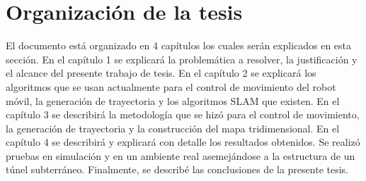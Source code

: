 


\section{Organizaci\'on de la tesis}

El documento está organizado en 4 capítulos los cuales serán explicados en esta
sección. En el capítulo 1 se explicará la problemática a resolver, la justificación y 
el alcance del presente trabajo de tesis. En el capítulo 2 se explicará los algoritmos 
que se usan actualmente para el control de movimiento del robot móvil, la generación 
de trayectoria y  los algoritmos SLAM que existen. En el capítulo 3 se describirá la 
metodología que se hizó para el control de movimiento, la generación de trayectoria y 
la construcción del mapa tridimensional. En el capítulo 4 se describirá y explicará 
con detalle los resultados obtenidos. Se realizó pruebas en simulación y en un ambiente 
real asemejándose a la estructura de un túnel subterráneo. Finalmente, se describé las 
conclusiones de la presente tesis.